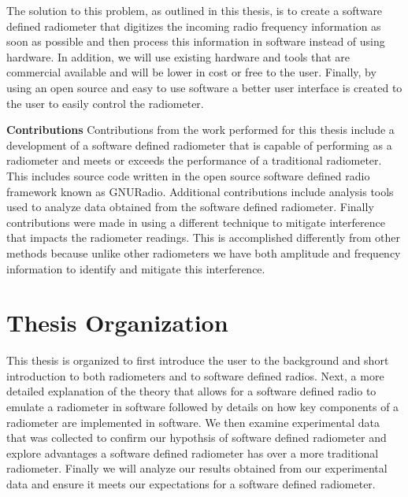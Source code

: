 The solution to this problem, as outlined in this thesis, is to create a software defined radiometer that digitizes the incoming radio frequency information as soon as possible and then process this information in software instead of using hardware.  In addition, we will use existing hardware and tools that are commercial available and will be lower in cost or free to the user.  Finally, by using an open source and easy to use software a better user interface is created to the user to easily control the radiometer.

\textbf{Contributions}
Contributions from the work performed for this thesis include a development of a software defined radiometer that is capable of performing as a radiometer and meets or exceeds the performance of a traditional radiometer.  This includes source code written in the open source software defined radio framework known as GNURadio.  Additional contributions include analysis tools used to analyze data obtained from the software defined radiometer.  Finally contributions were made in using a different technique to mitigate interference that impacts the radiometer readings.  This is accomplished differently from other methods because unlike other radiometers we have both amplitude and frequency information to identify and mitigate this interference.

\section{Thesis Organization}
This thesis is organized to first introduce the user to the background and short introduction to both radiometers and to software defined radios.  Next, a more detailed explanation of the theory that allows for a software defined radio to emulate a radiometer in software followed by details on how key components of a radiometer are implemented in software.  We then examine experimental data that was collected to confirm our hypothsis of software defined radiometer and explore advantages a software defined radiometer has over a more traditional radiometer.  Finally we will analyze our results obtained from our experimental data and ensure it meets our expectations for a software defined radiometer.


